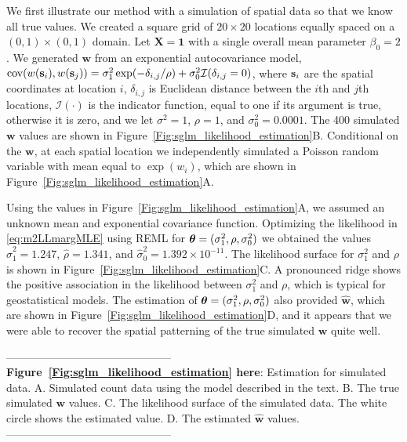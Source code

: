 \documentclass[12pt, titlepage]{article}
\begin{document}
We first illustrate our method with a simulation of spatial data so that we know all true values.  We created a square grid of $20 \times 20$ locations equally spaced on a $(0,1) \times (0,1)$ domain. Let $\mathbf{X} = \mathbf{1}$ with a single overall mean parameter $\beta_{0} = 2$.  We generated $\mathbf{w}$ from  an exponential autocovariance model, $\textrm{cov}(w(\mathbf{s}_{i}),w(\mathbf{s}_{j})) = \sigma^{2}_{1}\exp(-\delta_{i,j}/\rho) + \sigma^{2}_{0}\mathcal{I}(\delta_{i,j} = 0)$, where $\mathbf{s}_{i}$ are the spatial coordinates at location $i$, $\delta_{i,j}$ is Euclidean distance between the $i$th and $j$th locations,  $\mathcal{I}(\cdot)$ is the indicator function, equal to one if its argument is true, otherwise it is zero, and we let $\sigma^{2} = 1$, $\rho = 1$, and $\sigma^{2}_{0} = 0.0001$.  The 400 simulated $\mathbf{w}$ values are shown in Figure~\ref{Fig:sglm_likelihood_estimation}B.  Conditional on the $\mathbf{w}$, at each spatial location we independently simulated a Poisson random variable with mean equal to $\exp(w_{i})$, which are shown in Figure~\ref{Fig:sglm_likelihood_estimation}A.

Using the values in Figure~\ref{Fig:sglm_likelihood_estimation}A, we assumed an unknown mean and exponential covariance function. Optimizing the likelihood in \eqref{eq:m2LLmargMLE} using REML for $\boldsymbol{\theta} = (\sigma_{1}^{2},\rho, \sigma_{0}^{2})$ we obtained the values $\hat{\sigma}_{1}^{2} = 1.247$, $\hat{\rho} = 1.341$, and $\hat{\sigma}_{0}^{2} = 1.392 \times 10^{-11}$.  The likelihood surface for $\sigma_{1}^{2}$ and $\rho$ is shown in Figure~\ref{Fig:sglm_likelihood_estimation}C. A pronounced ridge shows the positive association in the likelihood between $\sigma_{1}^{2}$ and $\rho$, which is typical for geostatistical models. The estimation of $\boldsymbol{\theta} = (\sigma_{1}^{2},\rho, \sigma_{0}^{2})$ also provided $\hat{\mathbf{w}}$, which are shown in Figure~\ref{Fig:sglm_likelihood_estimation}D, and it appears that we were able to recover the spatial patterning of the true simulated $\mathbf{w}$ quite well.

\begin{spacing}{0.8}
\vspace{.4cm}
\noindent --------------------------------------------- \\
\textbf{Figure~\ref{Fig:sglm_likelihood_estimation} here}: Estimation for simulated data. A. Simulated count data using the model described in the text.  B. The true simulated $\mathbf{w}$ values. C. The likelihood surface of the simulated data.  The white circle shows the estimated value.  D. The estimated $\hat{\mathbf{w}}$ values. \\
--------------------------------------------- \\ 
\end{spacing}
\end{document}

